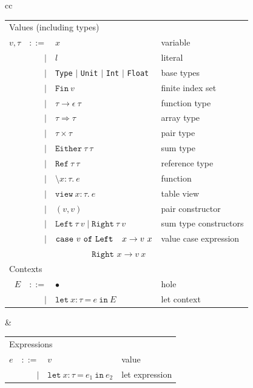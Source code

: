 \documentclass[acmsmall,screen,nonacm]{acmart}
\newcommand{\ttt}[1]{\texttt{#1}}
\newcommand{\fin}[1]{\ttt{Fin}~{#1}}
\newcommand{\letx}[3]{\ttt{let}~#1~\ttt{=}~#2~\ttt{in}~#3}
\newcommand{\lam}[3]{\ttt{\textbackslash} #1\!:\!#2 .~ #3}
\newcommand{\view}[3]{\ttt{view}~#1\!:\!#2 .~ #3}
\newcommand{\case}[3]{\ttt{case}~#1~\ttt{of}~
                         \ttt{Left  $x$} \rightarrow #2;~
                         \ttt{Right $x$} \rightarrow #3}
\begin{document}
\begin{figure}[t]\scriptsize
\begin{tabular}{cc}
\begin{tabular}{r@{~~}r@{~~}ll}
  \multicolumn{3}{l}{Values (including types)} \\
  $v, \tau$ & $::=$ & $x$ & variable \\
  & $\mid$ & $l$               & literal \\
  & $\mid$ & \ttt{Type} $\mid$ \ttt{Unit} $\mid$ \ttt{Int} $\mid$ \ttt{Float} & base types \\
  & $\mid$ & $\fin v$   & finite index set \\
  & $\mid$ & $\tau \rightarrow {\epsilon}~\tau $   & function type \\%
  & $\mid$ & $\tau \Rightarrow \tau $   & array type \\
  & $\mid$ & $\tau \times \tau$         & pair type \\
  & $\mid$ & $\ttt{Either}~\tau~\tau$   & sum type \\
  & $\mid$ & $\ttt{Ref}~\tau~\tau$   & reference type \\
  & $\mid$ & $\lam x \tau e$   & function \\
  & $\mid$ & $\view x \tau e$  & table view \\
  & $\mid$ & $(v,v)$  & pair constructor \\
  & $\mid$ & $\ttt{Left}~\tau~v \mid \ttt{Right}~\tau~v$  & sum type constructors \\
  & $\mid$ & $\ttt{case}~v~\ttt{of}~
                         \ttt{Left\phantom{-} $x$} \rightarrow v~x$         & value case expression \\
  & & $\phantom{\ttt{case}~v~\ttt{of}~}
                         \ttt{Right $x$} \rightarrow v~x$         &\\
  \multicolumn{3}{l}{Contexts} \\
  $E$ & $::=$
           & $\bullet$  & hole\\
  & $\mid$ & $\letx {x:\tau} {e} E$  & let context \\
\end{tabular}
&
\begin{tabular}{r@{~}r@{~}ll}
  \multicolumn{3}{l}{Expressions} \\
  $e$ & $::=$
           &  $v$                  & value \\
  & $\mid$ & $\letx {x:\tau} {e_1} {e_2}$  & let expression \\

\end{tabular}
\end{tabular}
\end{figure}
\end{document}
